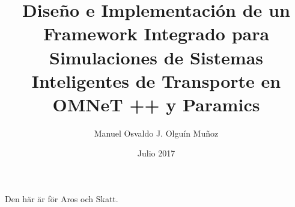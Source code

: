 \documentclass[upright, contnum]{umemoria}
\author{Manuel Osvaldo J. Olguín Muñoz}
\title{Diseño e Implementación de un Framework Integrado para Simulaciones de Sistemas Inteligentes de Transporte en OMNeT ++ y Paramics}
\date{Julio 2017}
\newcommand{\blankpage}{
    \newpage
    \mbox{}
    \newpage
}
\begin{document}
\frontmatter
\maketitle

\begin{abstract}
\lipsum[1-4]
\end{abstract}

\begin{dedicatoria}
Den här är för Aros och Skatt.
\end{dedicatoria}

\begin{thanks}
\lipsum[1-2]
\end{thanks}

\cleardoublepage
\tableofcontents
\cleardoublepage
\listoftables
\cleardoublepage
\listoffigures

\mainmatter





\blankpage
\cleardoublepage
\begin{multicols}{2}[\printbibheading]
    \printbibliography[heading=none]
\end{multicols}

\appendix

\end{document}
